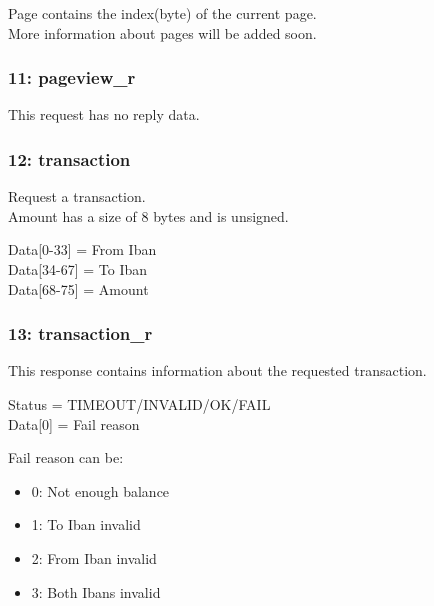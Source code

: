 \documentclass[12pt]{article}
\begin{document}
Page contains the index(byte) of the current page.\\
More information about pages will be added soon.

\subsubsection{11: pageview\_r}
This request has no reply data.

\subsubsection{12: transaction}
Request a transaction.\\
Amount has a size of 8 bytes and is unsigned.

Data[0-33] = From Iban\\
Data[34-67] = To Iban\\
Data[68-75] = Amount

\subsubsection{13: transaction\_r}
This response contains information about the requested transaction.

Status = TIMEOUT/INVALID/OK/FAIL\\
Data[0] = Fail reason

Fail reason can be:
\begin{itemize}
	\item 0: Not enough balance
	\item 1: To Iban invalid
	\item 2: From Iban invalid
	\item 3: Both Ibans invalid
\end{itemize}
\end{document}

